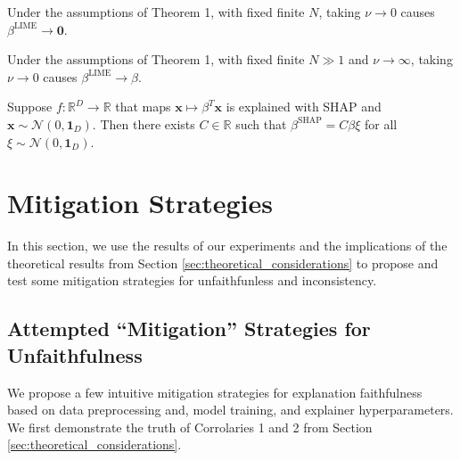\documentclass[mnsc,blindrev]{informs3}
\begin{document}
            \begin{corollary}
                Under the assumptions of Theorem 1, with fixed finite $N$, taking $\nu \rightarrow 0$ causes $\beta^{\text{LIME}} \rightarrow \mathbf{0}$. 
            \end{corollary}
            
            \begin{corollary}
                Under the assumptions of Theorem 1, with fixed finite $N \gg 1$ and $\nu\rightarrow \infty$, taking $\nu \rightarrow 0$ causes $\beta^{\text{LIME}} \rightarrow \beta$. 
            \end{corollary}

            \begin{theorem}
                \label{thm:shap_thm}
                Suppose $f:\mathbb{R}^D\rightarrow \mathbb{R}$ that maps $\mathbf{x} \mapsto \beta^T \mathbf{x}$ is explained with SHAP and $\mathbf{x} \sim \mathcal{N}(0, \mathbf{1}_D)$. Then there exists $C\in \mathbb{R}$ such that $\beta^{\text{SHAP}} = C \beta \xi$ for all $\xi \sim \mathcal{N}(0, \mathbf{1}_D)$. 
            \end{theorem}


\section{Mitigation Strategies}
    In this section, we use the results of our experiments and the implications of the theoretical results from Section \ref{sec:theoretical_considerations} to propose and test some mitigation strategies for unfaithfunless and inconsistency.

    \subsection{Attempted ``Mitigation'' Strategies for Unfaithfulness}
    \label{sec:incorrectness_mitigation} %
        We propose a few intuitive mitigation strategies for explanation faithfulness based on data preprocessing and, model training, and explainer hyperparameters. We first demonstrate the truth of Corrolaries 1 and 2 from Section \ref{sec:theoretical_considerations}.
\end{document}
